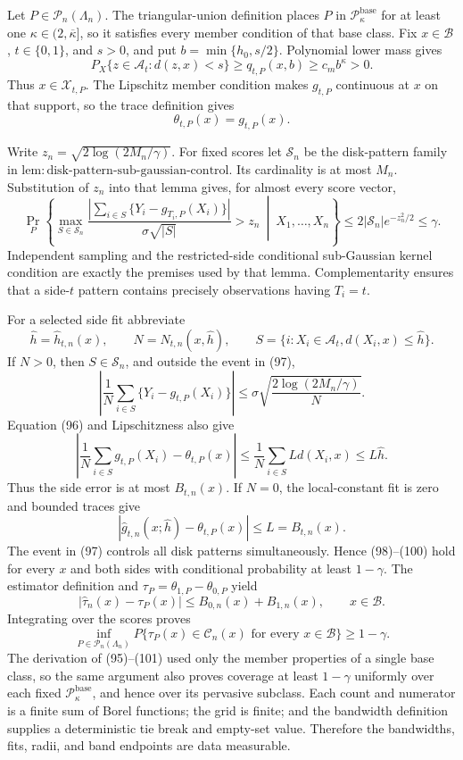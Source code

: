 Let \(P\in\mathcal P_n(\Lambda_n)\).  The triangular-union definition
places \(P\) in \(\mathcal P_{\kappa}^{\mathrm{base}}\) for at least one
\(\kappa\in(2,\overline\kappa]\), so it satisfies every member condition
of that base class.  Fix \(x\in\mathcal B\), \(t\in\{0,1\}\), and
\(s>0\), and put \(b=\min\{h_0,s/2\}\).  Polynomial lower mass gives
\[
 P_X\{z\in\mathcal A_t:d(z,x)<s\}
 \ge q_{t,P}(x,b)\ge c_mb^\kappa>0.
 \tag{95}
\]
Thus \(x\in\mathcal X_{t,P}\).  The Lipschitz member condition makes
\(g_{t,P}\) continuous at \(x\) on that support, so the trace definition
gives
\[
 \theta_{t,P}(x)=g_{t,P}(x).
 \tag{96}
\]

Write \(z_n=\sqrt{2\log(2M_n/\gamma)}\).  For fixed scores let
\(\mathscr S_n\) be the disk-pattern family in
\(\mathrm{lem:disk\text{-}pattern\text{-}sub\text{-}gaussian\text{-}control}\).
Its cardinality is at most \(M_n\).  Substitution of \(z_n\) into that
lemma gives, for almost every score vector,
\[
 \Pr_P\!\left\{
 \max_{S\in\mathscr S_n}
 \frac{|\sum_{i\in S}\{Y_i-g_{T_i,P}(X_i)\}|}
      {\sigma\sqrt{|S|}}>z_n
 \ \middle|\ X_1,\ldots,X_n\right\}
 \le2|\mathscr S_n|e^{-z_n^2/2}\le\gamma.
 \tag{97}
\]
Independent sampling and the restricted-side conditional sub-Gaussian
kernel condition are exactly the premises used by that lemma.
Complementarity ensures that a side-\(t\) pattern contains precisely
observations having \(T_i=t\).

For a selected side fit abbreviate
\[
 \widehat h=\widehat h_{t,n}(x),\qquad
 N=N_{t,n}(x,\widehat h),\qquad
 S=\{i:X_i\in\mathcal A_t, d(X_i,x)\le\widehat h\}.
\]
If \(N>0\), then \(S\in\mathscr S_n\), and outside the event in (97),
\[
 \left|\frac1N\sum_{i\in S}\{Y_i-g_{t,P}(X_i)\}\right|
 \le\sigma\sqrt{\frac{2\log(2M_n/\gamma)}N}.
 \tag{98}
\]
Equation (96) and Lipschitzness also give
\[
 \left|\frac1N\sum_{i\in S}g_{t,P}(X_i)-\theta_{t,P}(x)\right|
 \le\frac1N\sum_{i\in S}Ld(X_i,x)
 \le L\widehat h.
 \tag{99}
\]
Thus the side error is at most \(B_{t,n}(x)\).  If \(N=0\), the
local-constant fit is zero and bounded traces give
\[
 |\widehat g_{t,n}(x;\widehat h)-\theta_{t,P}(x)|
 \le L=B_{t,n}(x).
 \tag{100}
\]
The event in (97) controls all disk patterns simultaneously.  Hence
(98)--(100) hold for every \(x\) and both sides with conditional
probability at least \(1-\gamma\).  The estimator definition and
\(\tau_P=\theta_{1,P}-\theta_{0,P}\) yield
\[
 |\widehat\tau_n(x)-\tau_P(x)|
 \le B_{0,n}(x)+B_{1,n}(x),
 \qquad x\in\mathcal B.
 \tag{101}
\]
Integrating over the scores proves
\[
 \inf_{P\in\mathcal P_n(\Lambda_n)}
 P\{\tau_P(x)\in\mathcal C_n(x)\text{ for every }x\in\mathcal B\}
 \ge1-\gamma.
 \tag{102}
\]
The derivation of (95)--(101) used only the member properties of a single
base class, so the same argument also proves coverage at least
\(1-\gamma\) uniformly over each fixed
\(\mathcal P_\kappa^{\mathrm{base}}\), and hence over its pervasive
subclass.
Each count and numerator is a finite sum of Borel functions; the grid is
finite; and the bandwidth definition supplies a deterministic tie break
and empty-set value.  Therefore the bandwidths, fits, radii, and band
endpoints are data measurable.

